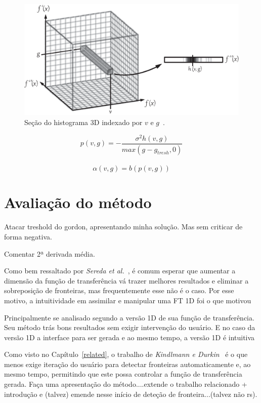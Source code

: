 \begin{figure}[h]
	\centering
	\includegraphics[width=1\textwidth]{images/g_hvg}
	\caption{Seção do histograma 3D indexado por $ v $ e $ g $~\cite{gordonms}.}
	\label{fig:g_hvg}
\end{figure}
    
\begin{equation} \label{eq:pvg}
	p(v,g) = -\frac{\sigma^{2}h(v,g)}{max(g - g_{tresh}, 0)}
\end{equation} \\

\begin{equation} \label{eq:alphavg}
	\alpha(v, g) = b(p(v, g))
\end{equation}

\section{Avaliação do método}
\label{gordon.aval}    
    Atacar treshold do gordon, apresentando minha solução. Mas sem criticar de forma negativa.
    
    Comentar 2ª derivada média.
    
    Como bem ressaltado por \textit{Sereda et al.}~\cite{sereda1}, é comum esperar que aumentar a dimensão da função de transferência vá trazer melhores resultados e eliminar a sobreposição de fronteiras, mas frequentemente esse não é o caso. Por esse motivo, a intuitividade em assimilar e manipular uma FT 1D foi o que motivou
    
    
    Principalmente se analisado segundo a versão 1D de sua função de transferência. Seu método trás bons resultados sem exigir intervenção do usuário. E no caso da versão 1D a interface para ser gerada e ao mesmo tempo, a versão 1D é intuitiva
    
    
    Como visto no Capítulo~\ref{related}, o trabalho de \textit{Kindlmann e Durkin}~\cite{gordon} é o que menos exige iteração do usuário para detectar fronteiras automaticamente e, ao mesmo tempo, permitindo que este possa controlar a função de transferência gerada.
    Faça uma apresentação do método....extende o trabalho relacionado + introdução e (talvez) emende nesse início de deteção de fronteira...(talvez não rs).